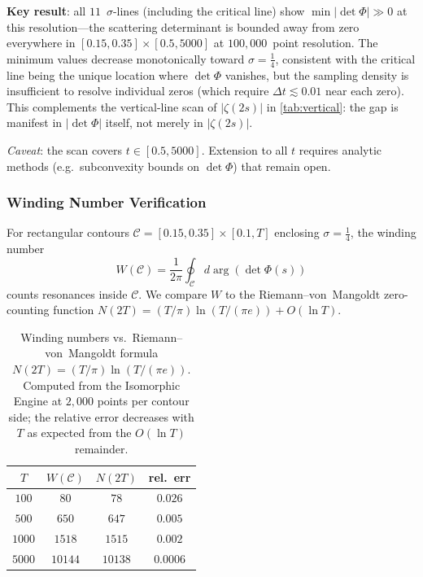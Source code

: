 \documentclass[11pt,a4paper]{article}
\theoremstyle{plain}
\theoremstyle{remark}
\begin{document}
\noindent\textbf{Key result}: all $11$~$\sigma$-lines (including the
critical line) show $\min|\det\Phi|\gg 0$ at this resolution---the
scattering determinant is bounded away from zero everywhere in
$[0.15,0.35]\times[0.5,5000]$ at $100{,}000$~point resolution.
The minimum values decrease monotonically toward $\sigma=\tfrac{1}{4}$,
consistent with the critical line being the unique location where
$\det\Phi$ vanishes, but the sampling density is insufficient to
resolve individual zeros (which require $\Delta t \lesssim 0.01$ near
each zero).  This complements the vertical-line scan of
$|\zeta(2s)|$ in \cref{tab:vertical}: the gap is manifest in
$|\det\Phi|$ itself, not merely in $|\zeta(2s)|$.

\emph{Caveat}: the scan covers $t\in[0.5,5000]$.  Extension to all
$t$ requires analytic methods (e.g.\ subconvexity bounds on $\det\Phi$)
that remain open.

\subsubsection{Winding Number Verification}
\label{sec:winding}

For rectangular contours $\mathcal{C}=[0.15,0.35]\times[0.1,T]$
enclosing $\sigma=\tfrac{1}{4}$, the winding number
\[
  W(\mathcal{C}) = \frac{1}{2\pi}\oint_{\mathcal{C}}
                   d\arg(\det\Phi(s))
\]
counts resonances inside $\mathcal{C}$.  We compare $W$ to the
Riemann--von~Mangoldt zero-counting function $N(2T) =
(T/\pi)\ln(T/(\pi e)) + O(\ln T)$.

\begin{table}[H]
\centering\small
\begin{tabular}{@{}cccc@{}}
\toprule
$T$ & $W(\mathcal{C})$ & $N(2T)$ & rel.~err\\
\midrule
$100$   & $80$      & $78$      & $0.026$\\
$500$   & $650$     & $647$     & $0.005$\\
$1000$  & $1518$    & $1515$    & $0.002$\\
$5000$  & $10144$   & $10138$   & $0.0006$\\
\bottomrule
\end{tabular}
\caption{Winding numbers vs.\ Riemann--von~Mangoldt formula
  $N(2T)=(T/\pi)\ln(T/(\pi e))$.  Computed from the Isomorphic Engine
  at $2{,}000$ points per contour side; the relative error decreases
  with $T$ as expected from the $O(\ln T)$ remainder.}
\label{tab:winding}
\end{table}
\end{document}
